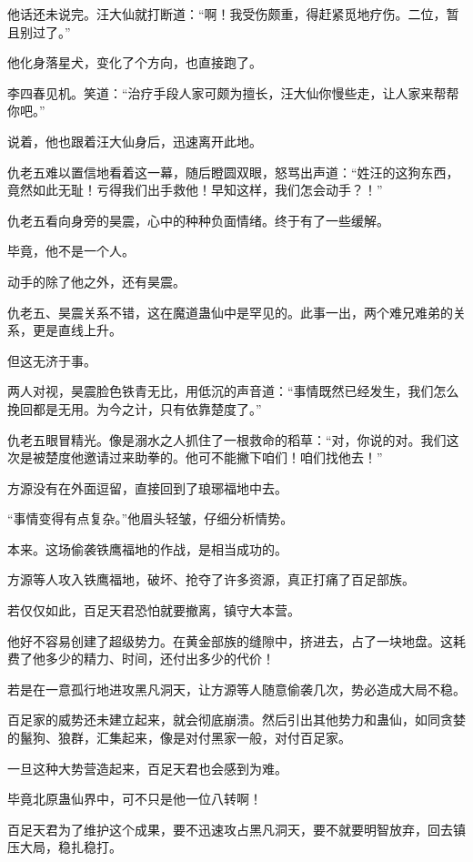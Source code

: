 \begin{this_body}
他话还未说完。汪大仙就打断道：“啊！我受伤颇重，得赶紧觅地疗伤。二位，暂且别过了。”

他化身落星犬，变化了个方向，也直接跑了。

李四春见机。笑道：“治疗手段人家可颇为擅长，汪大仙你慢些走，让人家来帮帮你吧。”

说着，他也跟着汪大仙身后，迅速离开此地。

仇老五难以置信地看着这一幕，随后瞪圆双眼，怒骂出声道：“姓汪的这狗东西，竟然如此无耻！亏得我们出手救他！早知这样，我们怎会动手？！”

仇老五看向身旁的昊震，心中的种种负面情绪。终于有了一些缓解。

毕竟，他不是一个人。

动手的除了他之外，还有昊震。

仇老五、昊震关系不错，这在魔道蛊仙中是罕见的。此事一出，两个难兄难弟的关系，更是直线上升。

但这无济于事。

两人对视，昊震脸色铁青无比，用低沉的声音道：“事情既然已经发生，我们怎么挽回都是无用。为今之计，只有依靠楚度了。”

仇老五眼冒精光。像是溺水之人抓住了一根救命的稻草：“对，你说的对。我们这次是被楚度他邀请过来助拳的。他可不能撇下咱们！咱们找他去！”

方源没有在外面逗留，直接回到了琅琊福地中去。

“事情变得有点复杂。”他眉头轻皱，仔细分析情势。

本来。这场偷袭铁鹰福地的作战，是相当成功的。

方源等人攻入铁鹰福地，破坏、抢夺了许多资源，真正打痛了百足部族。

若仅仅如此，百足天君恐怕就要撤离，镇守大本营。

他好不容易创建了超级势力。在黄金部族的缝隙中，挤进去，占了一块地盘。这耗费了他多少的精力、时间，还付出多少的代价！

若是在一意孤行地进攻黑凡洞天，让方源等人随意偷袭几次，势必造成大局不稳。

百足家的威势还未建立起来，就会彻底崩溃。然后引出其他势力和蛊仙，如同贪婪的鬣狗、狼群，汇集起来，像是对付黑家一般，对付百足家。

一旦这种大势营造起来，百足天君也会感到为难。

毕竟北原蛊仙界中，可不只是他一位八转啊！

百足天君为了维护这个成果，要不迅速攻占黑凡洞天，要不就要明智放弃，回去镇压大局，稳扎稳打。


\end{this_body}
